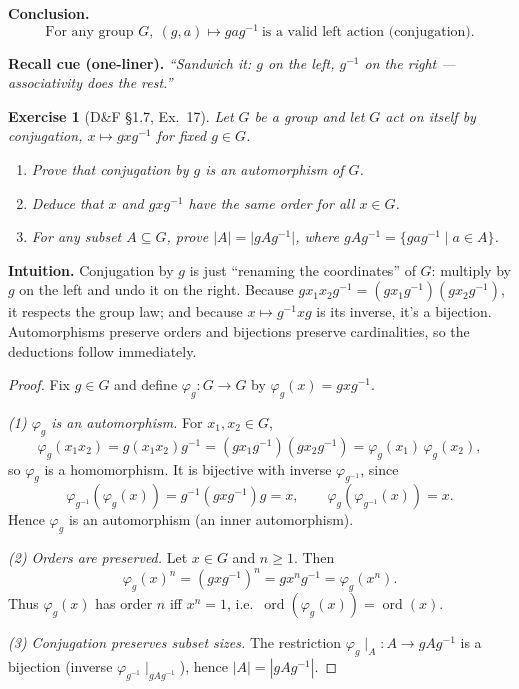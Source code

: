 \documentclass[12pt]{article}
\newtheorem{exercise}[theorem]{Exercise}
\theoremstyle{definition}
\begin{document}
\medskip
\noindent\textbf{Conclusion.}
\[
\boxed{\ \text{For any group }G,\ (g,a)\mapsto gag^{-1}\ \text{is a valid left action (conjugation).}\ }
\]

\medskip
\noindent\textbf{Recall cue (one-liner).} \emph{“Sandwich it: $g$ on the left, $g^{-1}$ on the right — associativity does the rest.”}

\newpage

\begin{exercise}[D\&F §1.7, Ex.~17]
Let $G$ be a group and let $G$ act on itself by conjugation, $x\mapsto gxg^{-1}$ for fixed $g\in G$.
\begin{enumerate}
\item Prove that conjugation by $g$ is an automorphism of $G$.
\item Deduce that $x$ and $gxg^{-1}$ have the same order for all $x\in G$.
\item For any subset $A\subseteq G$, prove $\lvert A\rvert=\lvert gAg^{-1}\rvert$, where $gAg^{-1}=\{gag^{-1}\mid a\in A\}$.
\end{enumerate}
\end{exercise}

\dotfill

\noindent\textbf{Intuition.}
Conjugation by $g$ is just “renaming the coordinates” of $G$: multiply by $g$ on the left and undo it on the right.
Because $gx_1x_2g^{-1}=(gx_1g^{-1})(gx_2g^{-1})$, it respects the group law; and because $x\mapsto g^{-1}xg$ is its inverse, it’s a bijection.
Automorphisms preserve orders and bijections preserve cardinalities, so the deductions follow immediately.

\dotfill

\begin{proof}
Fix $g\in G$ and define $\varphi_g:G\to G$ by $\varphi_g(x)=gxg^{-1}$.

\smallskip
\noindent\emph{(1) $\varphi_g$ is an automorphism.}
For $x_1,x_2\in G$,
\[
\varphi_g(x_1x_2)=g(x_1x_2)g^{-1}=(gx_1g^{-1})(gx_2g^{-1})=\varphi_g(x_1)\,\varphi_g(x_2),
\]
so $\varphi_g$ is a homomorphism. It is bijective with inverse $\varphi_{g^{-1}}$, since
\[
\varphi_{g^{-1}}(\varphi_g(x))=g^{-1}(gxg^{-1})g=x,\qquad
\varphi_g(\varphi_{g^{-1}}(x))=x.
\]
Hence $\varphi_g$ is an automorphism (an inner automorphism).

\smallskip
\noindent\emph{(2) Orders are preserved.}
Let $x\in G$ and $n\ge 1$. Then
\[
\varphi_g(x)^n=(gxg^{-1})^n=gx^ng^{-1}=\varphi_g(x^n).
\]
Thus $\varphi_g(x)$ has order $n$ iff $x^n=1$, i.e.\ $\operatorname{ord}(\varphi_g(x))=\operatorname{ord}(x)$.

\smallskip
\noindent\emph{(3) Conjugation preserves subset sizes.}
The restriction $\varphi_g\!\mid_A:A\to gAg^{-1}$ is a bijection (inverse $\varphi_{g^{-1}}\!\mid_{gAg^{-1}}$), hence $|A|=|gAg^{-1}|$.
\end{proof}
\end{document}
